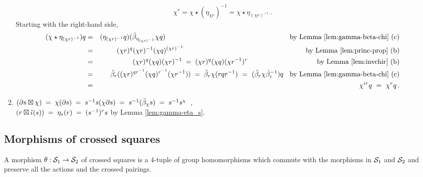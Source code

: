 \begin{example}
\begin{enumerate}[{\rm (a)}]
$$\chi^r = \chi \star (\eta_{\chi r})^{-1} = \chi \star \eta_{(\chi r)^{-1}}\,.
$$
Starting with the right-hand side, 
\begin{eqnarray*}
(\chi \star \eta_{(\chi r)^{-1}})q
 & = & (\eta_{(\chi r)^{-1}}q)(\ddb_{\eta_{(\chi r)^{-1}}} \chi q) 
        \hspace{62mm} \mbox{ by Lemma \ref{lem:gamma-beta-chi} (c)} \\
 & = & (\chi r)^q (\chi r)^{-1} (\chi q)^{(\chi r)^{-1}} 
        \hspace{61mm} \mbox{ by Lemma \ref{lem:princ-prop} (b)} \\
 & = & (\chi r)^q (\chi q) (\chi r)^{-1} 
 \;=\; (\chi r)^q (\chi q) (\chi r^{-1})^r 
        \hspace{34mm} \mbox{ by Lemma \ref{lem:invchir} (b)}    \\
 & = & \ddb_r((\chi r)^{qr^{-1}} (\chi q)^{r^{-1}} (\chi r^{-1})) 
 \;=\; \ddb_r \chi(rqr^{-1})
   ~=~ (\ddb_r\chi\db_r^{-1})q
        \hspace{2mm} \mbox{ by Lemma \ref{lem:gamma-beta-chi} (c)} \\
 & = & \chi^{\di r}q
   ~=~ \chi^r q\,.
\end{eqnarray*}
\item
\quad $(\partial s \boxtimes \chi) 
  \;=\; \chi(\partial s) 
  \;=\; s^{-1} s (\chi\partial s) 
  \;=\; s^{-1} (\ddot{\beta}_{\chi} s) 
  \;=\; s^{-1} s^{\chi}$~, \\
\medskip
\hspace*{4mm}$(r \boxtimes \ddot{\iota}(s)) \;=\; \eta_{s}(r) \;=\; (s^{-1})^r s$
  \hspace{74mm} by Lemma \ref{lem:gamma-eta_s}. \\
\end{enumerate}
\end{example}

\vspace*{12mm}
\subsection{Morphisms of crossed squares} 

A morphism $\theta : \mathcal{S}_1 \to \mathcal{S}_2$ of crossed squares 
is a $4$-tuple of group homomorphisms which commute with the
morphisms in $\mathcal{S}_1$ and $\mathcal{S}_2$ and preserve all the actions
and the crossed pairings.

